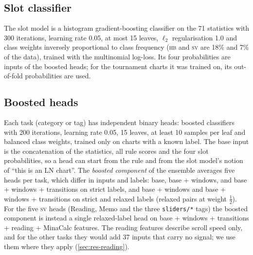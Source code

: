 \documentclass[10pt,twocolumn]{article}
\newcommand{\utag}[1]{\texttt{\small #1}}
\newcommand{\HB}{\textsc{hb}}
\newcommand{\SV}{\textsc{sv}}
\begin{document}
\subsection{Slot classifier}\label{sec:slot-model}
The slot model is a histogram gradient-boosting classifier \citep{ke2017lightgbm,pedregosa2011sklearn} on the 71 statistics with 300 iterations, learning rate 0.05, at most 15 leaves, $\ell_2$ regularisation 1.0 and class weights inversely proportional to class frequency (\HB{} and \SV{} are 18\% and 7\% of the data), trained with the multinomial log-loss. Its four probabilities are inputs of the boosted heads; for the tournament charts it was trained on, its out-of-fold probabilities are used.

\subsection{Boosted heads}\label{sec:boosted}
Each task (category or tag) has independent binary heads: boosted classifiers with 200 iterations, learning rate 0.05, 15 leaves, at least 10 samples per leaf and balanced class weights, trained only on charts with a known label. The base input is the concatenation of the statistics, all rule scores and the four slot probabilities, so a head can start from the rule and from the slot model's notion of ``this is an LN chart''. The \emph{boosted component} of the ensemble averages five heads per task, which differ in inputs and labels: base, base + windows, and base + windows + transitions on strict labels, and base + windows and base + windows + transitions on strict and relaxed labels (relaxed pairs at weight $\tfrac12$). For the five \SV{} heads (Reading, Memo and the three \utag{sliders/*} tags) the boosted component is instead a single relaxed-label head on base + windows + transitions + reading + MinaCalc features. The reading features describe scroll speed only, and for the other tasks they would add 37 inputs that carry no signal; we use them where they apply (\cref{sec:res-reading}).
\end{document}
